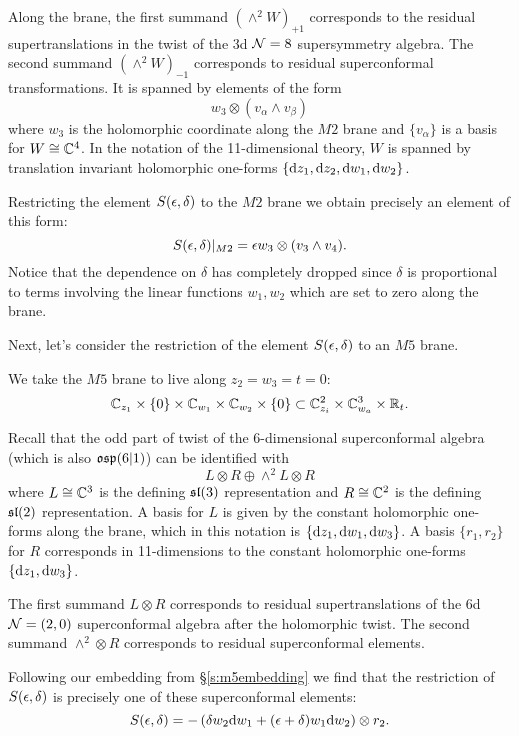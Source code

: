 \documentclass[11pt]{amsart}
\begin{document}
Along the brane, the first summand $(\wedge^2 W)_{+1}$ corresponds to the residual supertranslations in the twist of the 3d $\mathcal N=8$ supersymmetry algebra. 
The second summand $(\wedge^2 W)_{-1}$ corresponds to residual superconformal transformations. 
It is spanned by elements of the form 
\[
w_3 \otimes (v_\alpha \wedge v_\beta)
\]
where $w_3$ is the holomorphic coordinate along the $M2$ brane and $\{v_\alpha\}$ is a basis for $W \cong \mathbb C^4$.
In the notation of the 11-dimensional theory, $W$ is spanned by translation invariant holomorphic one-forms $\{{\rm d} z_1, {\rm d} z_2, {\rm d} w_1, {\rm d} w_2\}$. 

Restricting the element $S(\epsilon,\delta)$ to the $M2$ brane we obtain precisely an element of this form: 
\[
S(\epsilon,\delta)|_{M2} = \epsilon w_3 \otimes (v_3 \wedge v_4).
\]
Notice that the dependence on $\delta$ has completely dropped since $\delta$ is proportional to terms involving the linear functions $w_1,w_2$ which are set to zero along the brane. 


\parsec[]
Next, let's consider the restriction of the element $S(\epsilon, \delta)$ to an $M5$ brane. 

We take the $M5$ brane to live along $z_2 = w_3 = t = 0$:
\[
\mathbb C_{z_1} \times \{0\} \times \mathbb C_{w_1} \times \mathbb C_{w_2} \times \{0\} \subset \mathbb C^2_{z_i} \times  \mathbb C^3_{w_a} \times \mathbb R_t .
\] 

Recall that the odd part of twist of the 6-dimensional superconformal algebra (which is also $\mathfrak{osp}(6|1)$) can be identified with 
\[
L \otimes R \oplus \wedge^2 L \otimes R 
\]
where $L \cong \mathbb C^3$ is the defining $\mathfrak{sl}(3)$ representation and $R \cong \mathbb C^2$ is the defining $\mathfrak{sl}(2)$ representation. 
A basis for $L$ is given by the constant holomorphic one-forms along the brane, which in this notation is $\{{\rm d} z_1, {\rm d} w_1, {\rm d} w_3\}$. 
A basis $\{r_1,r_2\}$ for $R$ corresponds in 11-dimensions to the constant holomorphic one-forms $\{{\rm d} z_1, {\rm d} w_3\}$. 

The first summand $L \otimes R$ corresponds to residual supertranslations of the 6d $\mathcal N=(2,0)$ superconformal algebra after the holomorphic twist. 
The second summand $\wedge^2 \otimes R$ corresponds to residual superconformal elements. 

Following our embedding from \S \ref{s:m5embedding} we find that the restriction of $S(\epsilon, \delta)$ is precisely one of these superconformal elements:
\[
S(\epsilon, \delta) = - \left(\delta w_2 {\rm d} w_1 + (\epsilon + \delta) w_1 {\rm d} w_2 \right) \otimes r_2 .
\]
\end{document}

